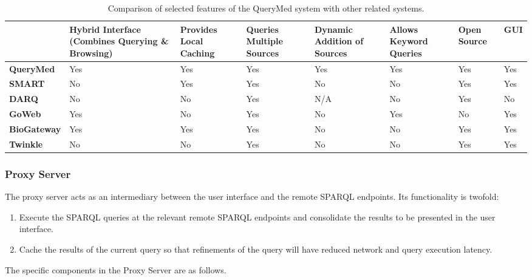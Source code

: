 \documentclass{www2010-submission}
\begin{document}
\begin{table*}
\begin{center}
\begin{tabular}{| p{1.8cm} | p{2cm} | p{1.8cm} | p{1.8cm}| p{1.8cm}| p{1.8cm}| p{1.8cm}| p{1.8cm} |}
\hline
 & \textbf{Hybrid Interface (Combines Querying \& Browsing)} & \textbf{Provides Local Caching} & \textbf{Queries Multiple Sources} & \textbf{Dynamic Addition of Sources} & \textbf{Allows Keyword Queries} & \textbf{Open Source} & \textbf{GUI} \\
\hline
\textbf{QueryMed}  & Yes & Yes & Yes & Yes & Yes & Yes & Yes  \\
\hline
\textbf{SMART}  & No & Yes & Yes & No & No & Yes & Yes  \\
\hline
\textbf{DARQ}  & No &  No & Yes & N/A & No & Yes & No  \\
\hline
\textbf{GoWeb}   & Yes & No  & Yes & No & Yes & No & Yes  \\
\hline
\textbf{BioGateway}   & Yes & Yes & Yes & No & No & Yes & Yes  \\
\hline
\textbf{Twinkle}   & No & No & Yes & No & No & Yes & Yes  \\
\hline
\end{tabular}
\caption{Comparison of selected features of the QueryMed system with other related systems.}
\label{comparison}
\end{center}
\end{table*}

\subsubsection{Proxy Server}

The proxy server acts as an intermediary between the user interface and the remote SPARQL endpoints.  Its functionality is twofold: 


\begin{enumerate}
\item Execute the SPARQL queries at the relevant remote SPARQL endpoints and consolidate the results to be presented in the user interface.
\item Cache the results of the current query so that refinements of the query will have reduced network and query execution latency.
\end{enumerate}


The specific components in the Proxy Server are as follows.
\end{document}
